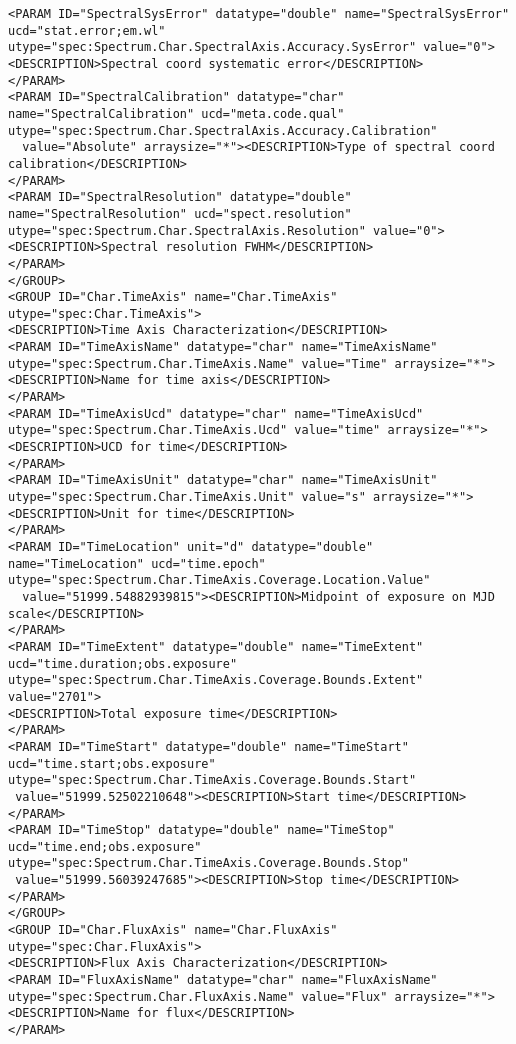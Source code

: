 \begin{landscape}
{\begin{flushleft}
\begin{fmlpage}
\begin{verbatim}
<PARAM ID="SpectralSysError" datatype="double" name="SpectralSysError" ucd="stat.error;em.wl" utype="spec:Spectrum.Char.SpectralAxis.Accuracy.SysError" value="0">
<DESCRIPTION>Spectral coord systematic error</DESCRIPTION>
</PARAM>
<PARAM ID="SpectralCalibration" datatype="char" name="SpectralCalibration" ucd="meta.code.qual" utype="spec:Spectrum.Char.SpectralAxis.Accuracy.Calibration"
  value="Absolute" arraysize="*"><DESCRIPTION>Type of spectral coord calibration</DESCRIPTION>
</PARAM>
<PARAM ID="SpectralResolution" datatype="double" name="SpectralResolution" ucd="spect.resolution" utype="spec:Spectrum.Char.SpectralAxis.Resolution" value="0">
<DESCRIPTION>Spectral resolution FWHM</DESCRIPTION>
</PARAM>
</GROUP>
<GROUP ID="Char.TimeAxis" name="Char.TimeAxis" utype="spec:Char.TimeAxis">
<DESCRIPTION>Time Axis Characterization</DESCRIPTION>
<PARAM ID="TimeAxisName" datatype="char" name="TimeAxisName" utype="spec:Spectrum.Char.TimeAxis.Name" value="Time" arraysize="*">
<DESCRIPTION>Name for time axis</DESCRIPTION>
</PARAM>
<PARAM ID="TimeAxisUcd" datatype="char" name="TimeAxisUcd" utype="spec:Spectrum.Char.TimeAxis.Ucd" value="time" arraysize="*">
<DESCRIPTION>UCD for time</DESCRIPTION>
</PARAM>
<PARAM ID="TimeAxisUnit" datatype="char" name="TimeAxisUnit" utype="spec:Spectrum.Char.TimeAxis.Unit" value="s" arraysize="*">
<DESCRIPTION>Unit for time</DESCRIPTION>
</PARAM>
<PARAM ID="TimeLocation" unit="d" datatype="double" name="TimeLocation" ucd="time.epoch" utype="spec:Spectrum.Char.TimeAxis.Coverage.Location.Value"
  value="51999.54882939815"><DESCRIPTION>Midpoint of exposure on MJD scale</DESCRIPTION>
</PARAM>
<PARAM ID="TimeExtent" datatype="double" name="TimeExtent" ucd="time.duration;obs.exposure" utype="spec:Spectrum.Char.TimeAxis.Coverage.Bounds.Extent" value="2701">
<DESCRIPTION>Total exposure time</DESCRIPTION>
</PARAM>
<PARAM ID="TimeStart" datatype="double" name="TimeStart" ucd="time.start;obs.exposure" utype="spec:Spectrum.Char.TimeAxis.Coverage.Bounds.Start"
 value="51999.52502210648"><DESCRIPTION>Start time</DESCRIPTION>
</PARAM>
<PARAM ID="TimeStop" datatype="double" name="TimeStop" ucd="time.end;obs.exposure" utype="spec:Spectrum.Char.TimeAxis.Coverage.Bounds.Stop" 
 value="51999.56039247685"><DESCRIPTION>Stop time</DESCRIPTION>
</PARAM>
</GROUP>
<GROUP ID="Char.FluxAxis" name="Char.FluxAxis" utype="spec:Char.FluxAxis">
<DESCRIPTION>Flux Axis Characterization</DESCRIPTION>
<PARAM ID="FluxAxisName" datatype="char" name="FluxAxisName" utype="spec:Spectrum.Char.FluxAxis.Name" value="Flux" arraysize="*">
<DESCRIPTION>Name for flux</DESCRIPTION>
</PARAM>

\end{verbatim}
\end{fmlpage}
\end{flushleft}}
\end{landscape}
